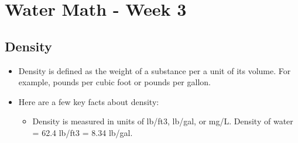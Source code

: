 \chapter{Water Math - Week 3}

\section*{Density}
\begin{itemize}
\item Density is defined as the weight of a substance per a unit of its volume. For example, pounds per cubic foot or pounds per gallon.

\item Here are a few key facts about density:
\begin{itemize}

\item Density is measured in units of lb/ft3, lb/gal, or mg/L. Density of water = 62.4 lb/ft3 = 8.34 lb/gal.
\end{itemize}
\end{itemize}

